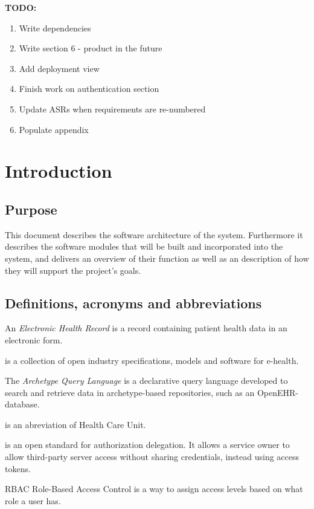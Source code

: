 \documentclass{article}
\begin{document}
\textbf{TODO:}
\begin{enumerate}[label=(\roman*)]
\item Write dependencies
\item Write section 6 - product in the future
\item Add deployment view
\item Finish work on authentication section
\item Update ASRs when requirements are re-numbered
\item Populate appendix
\end{enumerate}


\clearpage

\tableofcontents
\clearpage

\section{Introduction}
\subsection{Purpose}
This document describes the software architecture of the system. Furthermore it describes the software modules that will be built and incorporated into the system, and delivers an overview of their function as well as an description of how they will support the project's goals.

\subsection{Definitions, acronyms and abbreviations}
\begin{description}
\item [EHR] An \emph{Electronic Health Record} is a record containing patient health data in an electronic form.
\item [OpenEHR] is a collection of open industry specifications, models and software for e-health.
\item [AQL] The \emph{Archetype Query Language} is a declarative query language developed to search and retrieve data in archetype-based repositories, such as an OpenEHR-database.
\item [HCU] is an abreviation of Health Care Unit.
\item [OAuth] is an open standard for authorization delegation. It allows a service owner to allow third-party server access without sharing credentials, instead using access tokens. 
\item RBAC Role-Based Access Control is a way to assign access levels based on what role a user has.
\end{description}
\end{document}
